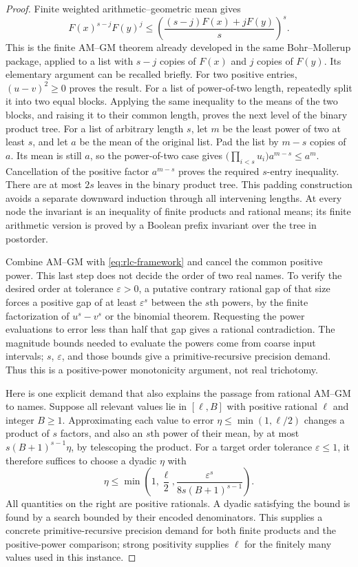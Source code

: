 \begin{proof}
Finite weighted arithmetic--geometric mean gives
\[
 F(x)^{s-j}F(y)^j
 \le\left(\frac{(s-j)F(x)+jF(y)}s\right)^s.
\]
This is the finite AM--GM theorem already developed in the same
Bohr--Mollerup package, applied to a list with $s-j$ copies of $F(x)$
and $j$ copies of $F(y)$.  Its elementary argument can be recalled
briefly.  For two positive entries, $(u-v)^2\ge0$ proves the result.
For a list of power-of-two length, repeatedly split it into two equal
blocks.  Applying the same inequality to the means of the two blocks,
and raising it to their common length, proves the next level of the
binary product tree.  For a list of arbitrary length $s$, let $m$ be
the least power of two at least $s$, and let $a$ be the mean of the
original list.  Pad the list by $m-s$ copies of $a$.  Its mean is still
$a$, so the power-of-two case gives
$\bigl(\prod_{i<s}u_i\bigr)a^{m-s}\le a^m$.
Cancellation of the positive factor $a^{m-s}$ proves the required
$s$-entry inequality.  There are at most $2s$ leaves in the binary
product tree.  This padding construction avoids a separate downward
induction through all intervening lengths.  At every node the
invariant is an inequality of finite products and rational means;
its finite arithmetic version is proved by a Boolean prefix invariant
over the tree in postorder.

Combine AM--GM with \eqref{eq:rlc-framework} and cancel the common
positive power.  This last step does not decide the order of two real
names.  To verify the desired order at tolerance $\varepsilon>0$,
a putative contrary rational gap of that size forces a positive gap
of at least $\varepsilon^s$ between the $s$th powers, by the finite
factorization of $u^s-v^s$ or the binomial theorem.  Requesting the
power evaluations to error less than half that gap gives a rational
contradiction.  The magnitude bounds needed to evaluate the powers
come from coarse input intervals; $s$, $\varepsilon$, and those
bounds give a primitive-recursive precision demand.  Thus this is
a positive-power monotonicity argument, not real trichotomy.

Here is one explicit demand that also explains the passage from
rational AM--GM to names.  Suppose all relevant values lie in
$[\ell,B]$ with positive rational $\ell$ and integer $B\ge1$.
Approximating each value to error $\eta\le\min(1,\ell/2)$ changes
a product of $s$ factors, and also an $s$th power of their mean,
by at most $s(B+1)^{s-1}\eta$, by telescoping the product.
For a target order tolerance $\varepsilon\le1$, it therefore
suffices to choose a dyadic $\eta$ with
\[
 \eta\le\min\left(1,\frac\ell2,
       \frac{\varepsilon^s}{8s(B+1)^{s-1}}\right).
\]
All quantities on the right are positive rationals.  A dyadic
satisfying the bound is found by a search bounded by their encoded
denominators.  This supplies a concrete primitive-recursive
precision demand for both finite products and the positive-power
comparison; strong positivity supplies $\ell$ for the finitely
many values used in this instance.
\end{proof}

